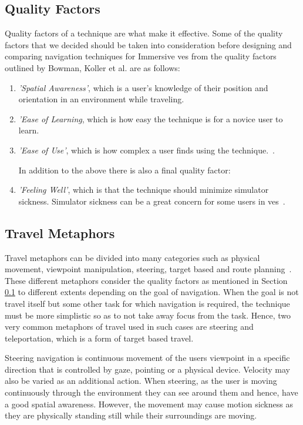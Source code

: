 \subsection{Quality Factors}
\label{subsection RW Navigation: Quality Factors}
Quality factors of a technique are what make it effective. Some of the quality factors that we decided should be taken into consideration before designing and comparing navigation techniques for Immersive \acrshort{ve}s from the quality factors outlined by Bowman, Koller et al. are as follows:
\begin{enumerate}
	\item \textit{'Spatial Awareness'}, which is a user's knowledge of their position and orientation in an environment while traveling.
	\item \textit{'Ease of Learning}, which is how easy the technique is for a novice user to learn.
	\item \textit{'Ease of Use'}, which is how complex a user finds using the technique.~\cite{Bowman1997}.
	
	In addition to the above there is also a final quality factor:
	\item \textit{'Feeling Well'}, which is that the technique should minimize simulator sickness. Simulator sickness can be a great concern for some users in \acrshort{ve}s~\cite{LaViola2000}.
\end{enumerate}

\subsection{Travel Metaphors}
\label{subsection RW Navigation: Travel Metaphors}
Travel metaphors can be divided into many categories such as physical movement, viewpoint manipulation, steering, target based and route planning~\cite{Bowman2001}. These different metaphors consider the quality factors as mentioned in Section \ref{subsection RW Navigation: Quality Factors} to different extents depending on the goal of navigation. When the goal is not travel itself but some other task for which navigation is required, the technique must be more simplistic so as to not take away focus from the task. Hence, two very common metaphors of travel used in such cases are steering and teleportation, which is a form of target based travel.

Steering navigation is continuous movement of the users viewpoint in a specific direction that is controlled by gaze, pointing or a physical device. Velocity may also be varied as an additional action. When steering, as the user is moving continuously through the environment they can see around them and hence, have a good spatial awareness. However, the movement may cause motion sickness as they are physically standing still while their surroundings are moving.

